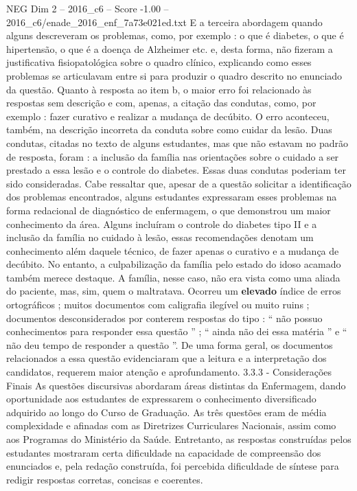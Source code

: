 \begin{textsample}{NEG Dim 2 – 2016\_c6 – Score -1.00 – 2016\_c6/enade\_2016\_enf\_7a73e021ed.txt}
E a terceira abordagem quando alguns descreveram os problemas, como, por exemplo : o que é diabetes, o que é hipertensão, o que é a doença de Alzheimer etc. e, desta forma, não fizeram a justificativa fisiopatológica sobre o quadro clínico, explicando como esses problemas se articulavam entre si para produzir o quadro descrito no enunciado da questão.
Quanto à resposta ao item b, o maior erro foi relacionado às respostas sem descrição e com, apenas, a citação das condutas, como, por exemplo : fazer curativo e realizar a mudança de decúbito.
O erro aconteceu, também, na descrição incorreta da conduta sobre como cuidar da lesão.
Duas condutas, citadas no texto de alguns estudantes, mas que não estavam no padrão de resposta, foram : a inclusão da família nas orientações sobre o cuidado a ser prestado a essa lesão e o controle do diabetes.
Essas duas condutas poderiam ter sido consideradas.
Cabe ressaltar que, apesar de a questão solicitar a identificação dos problemas encontrados, alguns estudantes expressaram esses problemas na forma redacional de diagnóstico de enfermagem, o que demonstrou um maior conhecimento da área.
Alguns incluíram o controle do diabetes tipo II e a inclusão da família no cuidado à lesão, essas recomendações denotam um conhecimento além daquele técnico, de fazer apenas o curativo e a mudança de decúbito.
No entanto, a culpabilização da família pelo estado do idoso acamado também merece destaque.
A família, nesse caso, não era vista como uma aliada do paciente, mas, sim, quem o maltratava.
Ocorreu um \textbf{elevado} índice de erros ortográficos ; muitos documentos com caligrafia ilegível ou muito ruins ; documentos desconsiderados por conterem respostas do tipo : “ não possuo conhecimentos para responder essa questão ” ; “ ainda não dei essa matéria ” e “ não deu tempo de responder a questão ”.
De uma forma geral, os documentos relacionados a essa questão evidenciaram que a leitura e a interpretação dos candidatos, requerem maior atenção e aprofundamento. 3.3.3 - Considerações Finais As questões discursivas abordaram áreas distintas da Enfermagem, dando oportunidade aos estudantes de expressarem o conhecimento diversificado adquirido ao longo do Curso de Graduação.
As três questões eram de média complexidade e afinadas com as Diretrizes Curriculares Nacionais, assim como aos Programas do Ministério da Saúde.
Entretanto, as respostas construídas pelos estudantes mostraram certa dificuldade na capacidade de compreensão dos enunciados e, pela redação construída, foi percebida dificuldade de síntese para redigir respostas corretas, concisas e coerentes.

\end{textsample}
